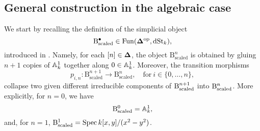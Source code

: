 \documentclass[10pt,a4paper,reqno]{amsart} %
\theoremstyle{plain}
\theoremstyle{definition}
\theoremstyle{remark}
\numberwithin{equation}{section}
\begin{document}
\subsection{General construction in the algebraic case} We start by recalling the definition of the simplicial object
    \[
        \mathrm{B}^\bullet_{\mathrm{scaled}} \in \operatorname{Fun}(\bm{\Delta} ^\mathrm{op}, \mathrm{dSt}_k),
    \]
introduced in
\cite[\S 9.2.2]{Gaitsgory_Study_II}. Namely, for each $[n] \in \bm{\Delta}$, the object $\mathrm{B}^{n}_\mathrm{scaled}$ is obtained by gluing $n+1$ copies of $\mathbb A^1_k$ together along
$0 \in \mathbb A^1_k$. Moreover, the transition morphisms
    \[
        p_{i, n} \colon  \mathrm{B}^{n+1}_\mathrm{scaled} \to \mathrm{B}^n_{\mathrm{scaled}}, \quad \mathrm{for} \ i \in \{0, \dots, n\} ,
    \]
collapse two given different irreducible components of $\mathrm B^{n+1}_\mathrm{scaled}$ into $\mathrm B^n_{\mathrm{scaled}}$. More explicitly, for $n=0$, we have
    \[
        \mathrm B_\mathrm{scaled}^0 = \mathbb A^1_k,  
    \]
and, for $n = 1$, $\mathrm B_\mathrm{scaled}^1 = \operatorname{Spec} k[x, y]/ (x^2 - y^2)$.
\end{document}
